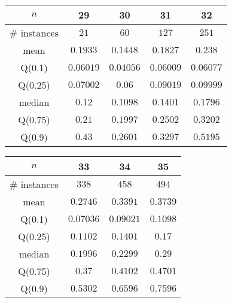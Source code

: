 \begin{tabular}{c|cccc} 
\hline 
$n$ & 29 & 30 & 31 & 32 \tabularnewline 
\hline 
\hline 
\# instances & $21$ & $60$ & $127$ & $251$ \tabularnewline 
mean & $0.1933$ & $0.1448$ & $0.1827$ & $0.238$ \tabularnewline 
Q(0.1) & $0.06019$ & $0.04056$ & $0.06009$ & $0.06077$ \tabularnewline 
Q(0.25) & $0.07002$ & $0.06$ & $0.09019$ & $0.09999$ \tabularnewline 
median & $0.12$ & $0.1098$ & $0.1401$ & $0.1796$ \tabularnewline 
Q(0.75) & $0.21$ & $0.1997$ & $0.2502$ & $0.3202$ \tabularnewline 
Q(0.9) & $0.43$ & $0.2601$ & $0.3297$ & $0.5195$ \tabularnewline 
\hline 
\end{tabular} 
\medskip{} 

\begin{tabular}{c|ccc} 
\hline 
$n$ & 33 & 34 & 35 \tabularnewline 
\hline 
\hline 
\# instances & $338$ & $458$ & $494$ \tabularnewline 
mean & $0.2746$ & $0.3391$ & $0.3739$ \tabularnewline 
Q(0.1) & $0.07036$ & $0.09021$ & $0.1098$ \tabularnewline 
Q(0.25) & $0.1102$ & $0.1401$ & $0.17$ \tabularnewline 
median & $0.1996$ & $0.2299$ & $0.29$ \tabularnewline 
Q(0.75) & $0.37$ & $0.4102$ & $0.4701$ \tabularnewline 
Q(0.9) & $0.5302$ & $0.6596$ & $0.7596$ \tabularnewline 
\hline 
\end{tabular} 
\medskip{} 

